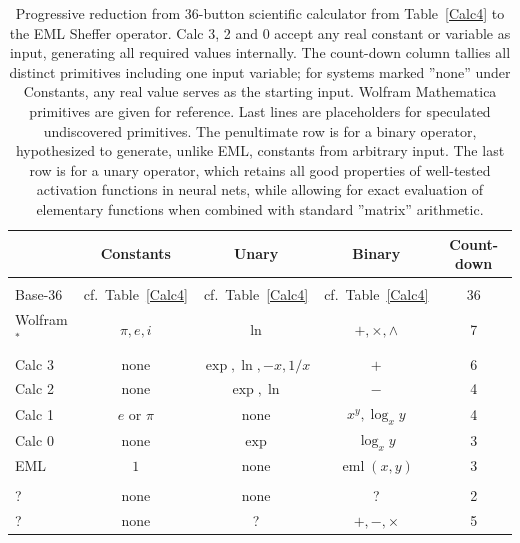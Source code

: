 \documentclass[12pt]{article}
\DeclareMathOperator{\eml}{eml}
\begin{document}
\begin{table}
\caption{\label{Mma} Progressive reduction from 36-button scientific calculator from Table~\ref{Calc4} to the EML Sheffer operator. Calc 3, 2 and 0 accept any real constant or variable as input, generating all required values internally. The count-down column tallies all distinct primitives including one input variable; for systems marked ''none'' under Constants, any real value serves as the starting input. Wolfram Mathematica primitives are given for reference.
Last lines are placeholders for speculated undiscovered primitives. The penultimate row is for a binary operator, hypothesized to generate, unlike EML, constants from arbitrary input. The last row is for a unary operator, which retains all good properties of well-tested activation functions in neural nets, while allowing for exact evaluation of elementary functions when combined with standard ''matrix'' arithmetic. }
\begin{tabular}{l|c  c  c  c }
             & Constants              &      Unary             & Binary                 & Count-down   \\ \hline \\
Base-36      & cf.~Table~\ref{Calc4}  & cf.~Table~\ref{Calc4}  & cf.~Table~\ref{Calc4}  & 36 \\[2pt]
Wolfram$^{*}$& $\pi, e, i$           & $\ln$                  & $+, \times, \wedge$    &  7 \\[2pt]
Calc 3       &  none                  & $\exp, \ln, -x, 1/x$   & $+$                    &  6 \\[2pt]
Calc 2       &  none                  & $\exp, \ln$            & $-$                    &  4 \\[2pt]
Calc 1       & $e$ or $\pi$           & none                   & $x^y, \log_{x}{y}$     &  4 \\[2pt]
Calc 0       &  none                  & $\exp$                 & $\log_{x}{y}$          &  3 \\[2pt]
EML          & $1$                    & none                   & $\eml{(x,y)}$          &  3 \\[6pt]
\hline \\[6pt]
 ?           &  none                   & none                  &   ?                   &  2 \\[2pt]
 ?           &  none                   & ?                     &  $+, -, \times$       &  5 \\[2pt]
\end{tabular}

\vspace{4pt}
\end{table}
\end{document}
